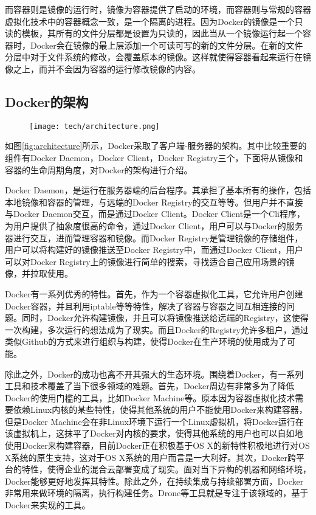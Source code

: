 而容器则是镜像的运行时，镜像为容器提供了启动的环境，而容器则与常规的容器虚拟化技术中的容器概念一致，是一个隔离的进程。因为Docker的镜像是一个只读的模板，其所有的文件分层都是设置为只读的，因此当从一个镜像运行起一个容器时，Docker会在镜像的最上层添加一个可读可写的新的文件分层。在新的文件分层中对于文件系统的修改，会覆盖原本的镜像。这样就使得容器看起来运行在镜像之上，而并不会因为容器的运行修改镜像的内容。

\subsection{Docker的架构}

\begin{figure}[!htp]
  \centering
  \texttt{[image: tech/architecture.png]}
\end{figure}

如图\ref{fig:architecture}所示，Docker采取了客户端-服务器的架构。其中比较重要的组件有Docker Daemon，Docker Client，Docker Registry三个，下面将从镜像和容器的生命周期角度，对Docker的架构进行介绍。

Docker Daemon，是运行在服务器端的后台程序。其承担了基本所有的操作，包括本地镜像和容器的管理，与远端的Docker Registry的交互等等。但用户并不直接与Docker Daemon交互，而是通过Docker Client。Docker Client是一个Cli程序，为用户提供了抽象度很高的命令，通过Docker Client，用户可以与Docker的服务器进行交互，进而管理容器和镜像。而Docker Registry是管理镜像的存储组件，用户可以将构建好的镜像推送至Docker Registry中，而通过Docker Client，用户可以对Docker Registry上的镜像进行简单的搜索，寻找适合自己应用场景的镜像，并拉取使用。

Docker有一系列优秀的特性。首先，作为一个容器虚拟化工具，它允许用户创建Docker容器，并且利用iptable等等特性，解决了容器与容器之间互相连接的问题。同时，Docker允许构建镜像，并且可以将镜像推送给远端的Registry，这使得一次构建，多次运行的想法成为了现实。而且Docker的Registry允许多租户，通过类似Github的方式来进行组织与构建，使得Docker在生产环境的使用成为了可能。

除此之外，Docker的成功也离不开其强大的生态环境。围绕着Docker，有一系列工具和技术覆盖了当下很多领域的难题。首先，Docker周边有非常多为了降低Docker的使用门槛的工具，比如Docker Machine等。原本因为容器虚拟化技术需要依赖Linux内核的某些特性，使得其他系统的用户不能使用Docker来构建容器，但是Docker Machine会在非Linux环境下运行一个Linux虚拟机，将Docker运行在该虚拟机上，这抹平了Docker对内核的要求，使得其他系统的用户也可以自如地使用Docker来构建容器，目前Docker正在积极基于OS X的新特性积极地进行对OS X系统的原生支持，这对于OS X系统的用户而言是一大利好。其次，Docker跨平台的特性，使得企业的混合云部署变成了现实。面对当下异构的机器和网络环境，Docker能够更好地发挥其特性。除此之外，在持续集成与持续部署方面，Docker非常用来做环境的隔离，执行构建任务。Drone等工具就是专注于该领域的，基于Docker来实现的工具。

